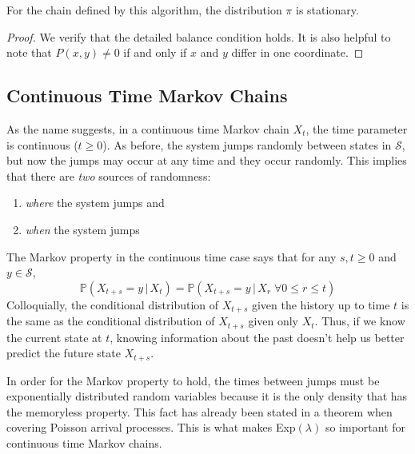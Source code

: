 \documentclass{article}
\begin{document}
      \begin{proposition}
        For the chain defined by this algorithm, the distribution $\pi$ is stationary. 
      \end{proposition}
      \begin{proof}
        We verify that the detailed balance condition holds. It is also helpful to note that $P(x, y) \neq 0$ if and only if $x$ and $y$ differ in one coordinate. 
      \end{proof}

  \subsection{Continuous Time Markov Chains}

    As the name suggests, in a continuous time Markov chain $X_t$, the time parameter is continuous ($t \geq 0$). As before, the system jumps randomly between states in $\mathcal{S}$, but now the jumps may occur at any time and they occur randomly. This implies that there are \textit{two} sources of randomness:
    \begin{enumerate}
      \item \textit{where} the system jumps and 
      \item \textit{when} the system jumps
    \end{enumerate}

    \begin{definition}
      The Markov property in the continuous time case says that for any $s, t \geq 0$ and $y \in \mathcal{S}$, 
      \begin{equation}
        \mathbb{P}(X_{t + s} = y \, | \, X_t) = \mathbb{P}(X_{t+s} = y \, | \, X_r \; \forall 0 \leq r \leq t)
      \end{equation}
      Colloquially, the conditional distribution of $X_{t+s}$ given the history up to time $t$ is the same as the conditional distribution of $X_{t+s}$ given only $X_t$. Thus, if we know the current state at $t$, knowing information about the past doesn't help us better predict the future state $X_{t+s}$. 

      In order for the Markov property to hold, the times between jumps must be exponentially distributed random variables because it is the only density that has the memoryless property. This fact has already been stated in a theorem when covering Poisson arrival processes. This is what makes Exp$(\lambda)$ so important for continuous time Markov chains. 
    \end{definition}
\end{document}
